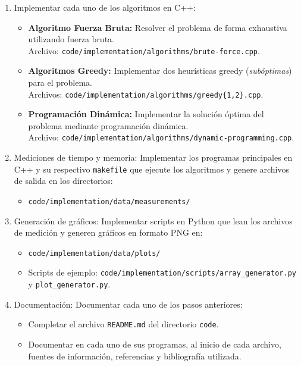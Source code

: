 \begin{enumerate}[(1)]
    \item Implementar cada uno de los algoritmos en C++:
    \begin{itemize}
        \item \textbf{Algoritmo Fuerza Bruta:} Resolver el problema de forma exhaustiva utilizando fuerza bruta. \\
        Archivo: \texttt{code/implementation/algorithms/brute-force.cpp}.
        
        \item \textbf{Algoritmos Greedy:} Implementar dos heurísticas greedy (\textit{subóptimas}) para el problema. \\
        Archivos: \texttt{code/implementation/algorithms/greedy\{1,2\}.cpp}.
        
        \item \textbf{Programación Dinámica:} Implementar la solución óptima del problema mediante programación dinámica. \\
        Archivo: \texttt{code/implementation/algorithms/dynamic-programming.cpp}.
    \end{itemize}


    \item Mediciones de tiempo y memoria: Implementar los programas principales en C++ y su respectivo \texttt{makefile} que ejecute los algoritmos y genere archivos de salida en los directorios:
    \begin{itemize}
        \item \texttt{code/implementation/data/measurements/}
    \end{itemize}

    \item Generación de gráficos: Implementar scripts en Python que lean los archivos de medición y generen gráficos en formato PNG en:
    \begin{itemize}
        \item \texttt{code/implementation/data/plots/}
        \item Scripts de ejemplo: \texttt{code/implementation/scripts/array\_generator.py} y \texttt{plot\_generator.py}.
    \end{itemize}

    \item Documentación: Documentar cada uno de los pasos anteriores:
    \begin{itemize}
        \item Completar el archivo \texttt{README.md} del directorio \texttt{code}.
        \item Documentar en cada uno de sus programas, al inicio de cada archivo, fuentes de información, referencias y bibliografía utilizada.
    \end{itemize}
\end{enumerate}

